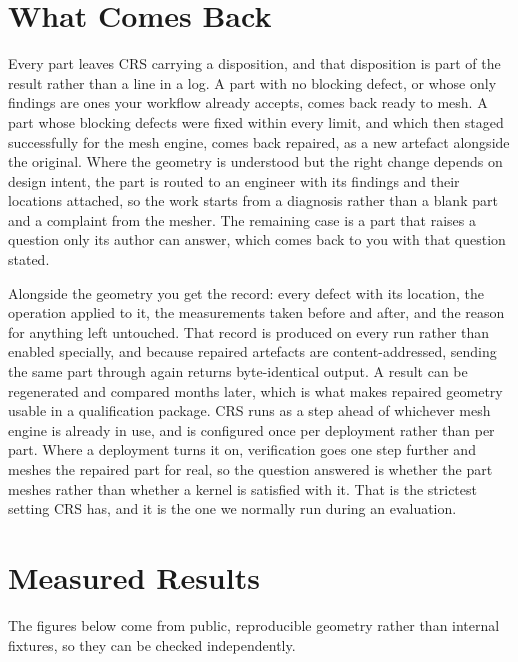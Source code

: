 \documentclass[10pt,onecolumn]{article}
\begin{document}
\section{What Comes Back}

Every part leaves CRS carrying a disposition, and that disposition is part of the result rather
than a line in a log. A part with no blocking defect, or whose only findings are ones your workflow
already accepts, comes back ready to mesh. A part whose blocking defects were fixed within every
limit, and which then staged successfully for the mesh engine, comes back repaired, as a new
artefact alongside the original. Where the geometry is understood but the right change depends on
design intent, the part is routed to an engineer with its findings and their locations attached, so
the work starts from a diagnosis rather than a blank part and a complaint from the mesher. The
remaining case is a part that raises a question only its author can answer, which comes back to you
with that question stated.

Alongside the geometry you get the record: every defect with its location, the operation applied to
it, the measurements taken before and after, and the reason for anything left untouched. That
record is produced on every run rather than enabled specially, and because repaired artefacts are
content-addressed, sending the same part through again returns byte-identical output. A result can
be regenerated and compared months later, which is what makes repaired geometry usable in a
qualification package. CRS runs as a step ahead of whichever mesh engine is already in use, and is
configured once per deployment rather than per part. Where a deployment turns it on, verification
goes one step further and meshes the repaired part for real, so the question answered is whether
the part meshes rather than whether a kernel is satisfied with it. That is the strictest setting
CRS has, and it is the one we normally run during an evaluation.

\section{Measured Results}\label{sec:results-anchor}

The figures below come from public, reproducible geometry rather than internal fixtures, so they
can be checked independently.
\end{document}
